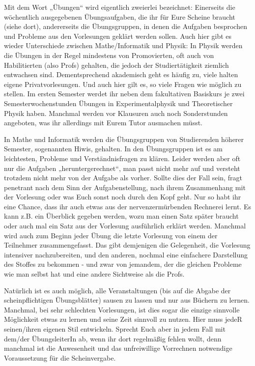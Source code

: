 Mit dem Wort „Übungen“ wird eigentlich zweierlei bezeichnet: Einerseits die
wöchentlich ausgegebenen Übungsaufgaben, die ihr für Eure Scheine braucht
(siehe dort), andererseits die Übungsgruppen, in denen die Aufgaben besprochen
und Probleme aus den Vorlesungen geklärt werden sollen. Auch hier gibt es
wieder Unterschiede zwischen Mathe/Informatik und Physik: In Physik werden die
Übungen in der Regel mindestens von Promovierten, oft auch von Habilitierten
(also Profs) gehalten, die jedoch der Studiertätigkeit ziemlich entwachsen
sind. Dementsprechend akademisch geht es häufig zu, viele halten eigene
Privatvorlesungen. Und auch hier gilt es, so viele Fragen wie möglich zu
stellen. Im ersten Semester werdet ihr neben dem fakultativen Basiskurs je zwei
Semesterwochenstunden Übungen in Experimentalphysik und Theoretischer Physik
haben. Manchmal werden vor Klausuren auch noch Sonderstunden angeboten, was ihr
allerdings mit Eurem Tutor ausmachen müsst.

In Mathe und Informatik werden die Übungsgruppen von Studierenden höherer
Semester, sogenannten Hiwis, gehalten. In den Übungsgruppen ist es am
leichtesten, Probleme und Verständnisfragen zu klären. Leider werden aber oft
nur die Aufgaben „heruntergerechnet“, man passt nicht mehr auf und versteht
trotzdem nicht mehr von der Aufgabe als vorher. Sollte dies der Fall sein,
fragt penetrant nach dem Sinn der Aufgabenstellung, nach ihrem Zusammenhang mit
der Vorlesung oder was Euch sonst noch durch den Kopf geht. Nur so habt ihr
eine Chance, dass ihr auch etwas aus der nervenzermürbenden Rechnerei lernt. Es
kann z.B. ein Überblick gegeben werden, wozu man einen Satz später braucht oder
auch mal ein Satz aus der Vorlesung ausführlich erklärt werden. Manchmal wird
auch zum Beginn jeder Übung die letzte Vorlesung von einem der Teilnehmer
zusammengefasst. Das gibt demjenigen die Gelegenheit, die Vorlesung intensiver
nachzubereiten, und den anderen, nochmal eine einfachere Darstellung des
Stoffes zu bekommen - und zwar von jemandem, der die gleichen Probleme wie man
selbst hat und eine andere Sichtweise als die Profs.

Natürlich ist es auch möglich, alle Veranstaltungen (bis auf die Abgabe der
scheinpflichtigen Übungsblätter) sausen zu lassen und nur aus Büchern zu
lernen. Manchmal, bei sehr schlechten Vorlesungen, ist dies sogar die einzige
sinnvolle Möglichkeit etwas zu lernen und seine Zeit sinnvoll zu nutzen. Hier
muss jedeR seinen/ihren eigenen Stil entwickeln. Sprecht Euch aber in jedem
Fall mit dem/der ÜbungsleiterIn ab, wenn ihr dort regelmäßig fehlen wollt, denn
manchmal ist die Anwesenheit und das unfreiwillige Vorrechnen notwendige
Voraussetzung für die Scheinvergabe.
